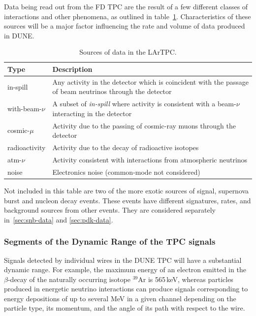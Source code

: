 Data being read out from the FD TPC are the result of a few different classes of interactions and other phenomena,
as outlined in table~\ref{tab:dune-data-sources}. Characteristics of these sources will
be a major factor influencing the rate and volume of data produced in DUNE.
\begin{table}[ht!]
	\centering
	\begin{tabular}{| p{1in} | p{4.5in} |}
		\hline
	\textbf{Type} & \textbf{Description} \\ \hline
		
	in-spill & Any activity in the detector which is coincident with
	the passage of beam neutrinos through the detector \\ \hline
	
	with-beam-$\nu$ & A subset of \textit{in-spill} where activity is
	consistent with a beam-$\nu$ interacting in the detector \\ \hline
	
	cosmic-$\mu$ & Activity due to the passing of cosmic-ray muons
	through the detector \\ \hline
	
	radioactivity & Activity due to the decay of radioactive
	isotopes \\ \hline
	
	atm-$\nu$ & Activity consistent with interactions from
	atmospheric neutrinos \\ \hline
	
	noise & Electronics noise (common-mode not considered) \\ \hline

	\end{tabular}
	\caption{Sources of data in the LArTPC.}
	\label{tab:dune-data-sources}
\end{table}

Not included in this table are two of the more exotic sources of signal, supernova burst and nucleon decay events.
These events have different signatures, rates, and background sources from other events.  
They are considered separately in~\ref{sec:snb-data} and \ref{sec:pdk-data}.  

\subsubsection{Segments of the Dynamic Range of the TPC signals}

Signals detected by individual wires in the DUNE TPC will have a substantial
dynamic range. For example, the maximum energy of an electron emitted in the $\beta$-decay of the naturally occurring isotope 
$^{39}$Ar is 565\,keV, whereas particles produced in energetic neutrino interactions can produce signals
corresponding to energy depositions of up to several MeV in a given channel depending on the particle type, its momentum,
and the angle of its path with respect to the wire.

